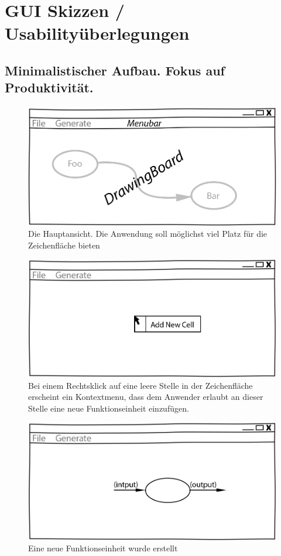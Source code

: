 \pagebreak
\chapter{GUI Skizzen / Usabilityüberlegungen}


\section{Minimalistischer Aufbau. Fokus auf Produktivität.}




\begin{figure}[H]
	\centering
\includegraphics[width=.9\linewidth]{./img/MainCrop.jpg}
	\caption{Die Hauptansicht. Die Anwendung soll möglichst viel Platz für die Zeichenfläche
		bieten}
\end{figure}





\begin{figure}[H]
	\centering
	\includegraphics[width=.9\linewidth]{./img/ContextMenu.jpg}
	\caption{Bei einem Rechtsklick auf eine leere Stelle in der Zeichenfläche erscheint ein Kontextmenu, dass dem Anwender erlaubt an dieser Stelle eine neue Funktionseinheit einzufügen.}
\end{figure}


\begin{figure}[H]
	\centering
\includegraphics[width=.9\linewidth]{./img/NewCell.jpg}
	\caption{Eine neue Funktionseinheit wurde erstellt}
\end{figure}





